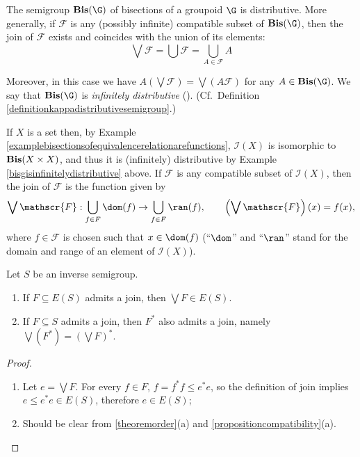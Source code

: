 \begin{example}\label{bisgisinfinitelydistributive}
The semigroup $\operatorname{\bf Bis}(\G)$ of bisections of a groupoid $\G$ is distributive. More generally, if $\mathscr{F}$ is any (possibly infinite) compatible subset of $\operatorname{\bf Bis}(\G)$, then the join of $\mathscr{F}$ exists and coincides with the union of its elements:
\[\bigvee\mathscr{F}=\bigcup\mathscr{F}=\bigcup_{A\in\mathscr{F}}A\]

Moreover, in this case we have $A(\bigvee \mathscr{F})=\bigvee(A\mathscr{F})$ for any $A\in\operatorname{\bf Bis}(\G)$. We say that $\operatorname{\bf Bis}(\G)$ is \emph{infinitely distributive} (\cite{MR2277324}). (Cf.\ Definition \ref{definitionkappadistributivesemigroup}.)
\end{example}

\begin{example}\label{exampleixisinfinitelydistributive}
	If $X$ is a set then, by Example \ref{examplebisectionsofequivalencerelationarefunctions}, $\mathcal{I}(X)$ is isomorphic to $\operatorname{\bf Bis}(X\times X)$, and thus it is (infinitely) distributive by Example \ref{bisgisinfinitelydistributive} above. If $\mathscr{F}$ is any compatible subset of $\mathcal{I}(X)$, then the join of $\mathscr{F}$ is the function given by
	\[\bigvee \mathscr{F}:\bigcup_{f\in F}\dom(f)\to\bigcup_{f\in F}\ran(f),\qquad \left(\bigvee \mathscr{F}\right)(x)=f(x),\]
	where $f\in \mathscr{F}$ is chosen such that $x\in\dom(f)$ (``$\dom$'' and ``$\ran$'' stand for the domain and range of an element of $\mathcal{I}(X)$).
\end{example}

\begin{proposition}\label{propositionpropertiesofjoins}
Let $S$ be an inverse semigroup.
\begin{enumerate}
\item[(a)] If $F\subseteq E(S)$ admits a join, then $\bigvee F\in E(S)$.
\item[(b)] If $F\subseteq S$ admits a join, then $F^*$ also admits a join, namely $\bigvee(F^*)=\left(\bigvee F\right)^*$.
\end{enumerate}
\end{proposition}
\begin{proof}
\begin{enumerate}
\item[(a)] Let $e=\bigvee F$. For every $f\in F$, $f=f^*f\leq e^*e$, so the definition of join implies $e\leq e^*e\in E(S)$, therefore $e\in E(S)$;
\item[(b)] Should be clear from \ref{theoremorder}(a) and \ref{propositioncompatibility}(a).\qedhere
\end{enumerate}
\end{proof}

